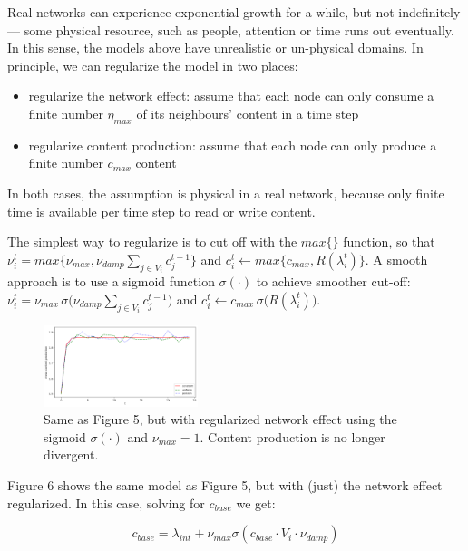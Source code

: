 \documentclass[final,5p,times,twocolumn,authoryear]{elsarticle}
\begin{document}
Real networks can experience exponential growth for a while, but not indefinitely --- some physical resource, such as people, attention or time runs out eventually. In this sense, the models above have unrealistic or un-physical domains. In principle, we can regularize the model in two places:

\begin{itemize}
\setlength\itemsep{0em}
    \item regularize the network effect: assume that each node can only consume a finite number $\eta_{max}$ of its neighbours' content in a time step
    \item regularize content production: assume that each node can only produce a finite number $c_{max}$ content
\end{itemize}

In both cases, the assumption is physical in a real network, because only finite time is available per time step to read or write content.

The simplest way to regularize is to cut off with the $max\{\}$ function, so that $\nu_i^t = max\{ \nu_{max}, \nu_{damp} \sum_{j \in V_i}{c_j^{t-1}} \}$ and $c_i^t \leftarrow max\{ c_{max}, R(\lambda_i^t) \}$. A smooth approach is to use a sigmoid function $\sigma(\cdot)$ to achieve smoother cut-off: $\nu_i^t = \nu_{max} \, \sigma \bigl( \nu_{damp} \sum_{j \in V_i}{c_j^{t-1}} \bigr) $ and $c_i^t \leftarrow c_{max} \, \sigma \bigl( R(\lambda_i^t) \bigr) $.

\begin{figure}[h]
	\centering 
	\includegraphics[width=0.4\textwidth]{figure-6.png}	
	\caption{Same as Figure 5, but with regularized network effect using the sigmoid $\sigma(\cdot)$ and $\nu_{max}=1$. Content production is no longer divergent.} 
\end{figure}

Figure 6 shows the same model as Figure 5, but with (just) the network effect regularized. In this case, solving for $c_{base}$ we get:

\begin{equation}
    c_{base} = \lambda_{int} + \nu_{max} \sigma( c_{base} \cdot \bar{V_i} \cdot \nu_{damp} )
\end{equation}
\end{document}
